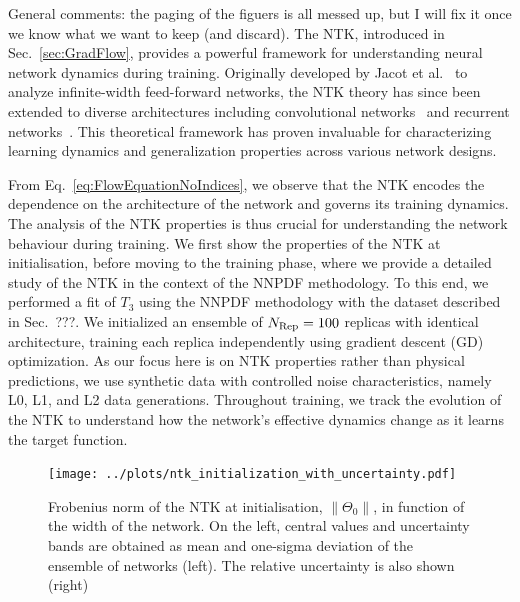\ac{General comments: the paging of the figuers is all messed up, but I will fix
it once we know what we want to keep (and discard).} The NTK, introduced in
Sec.~\ref{sec:GradFlow}, provides a powerful framework for understanding neural
network dynamics during training. Originally developed by Jacot et
al.~\cite{jacot2018neural} to analyze infinite-width feed-forward networks, the
NTK theory has since been extended to diverse architectures including
convolutional networks~\cite{arora2019exact} and recurrent
networks~\cite{alemohammad2021recurrent}. This theoretical framework has proven
invaluable for characterizing learning dynamics and generalization properties
across various network designs.

From Eq.~\eqref{eq:FlowEquationNoIndices}, we observe that the NTK encodes the
dependence on the architecture of the network and governs its training dynamics.
The analysis of the NTK properties is thus crucial for understanding the network
behaviour during training. We first show the properties of the NTK at
initialisation, before moving to the training phase, where we provide a detailed
study of the NTK in the context of the NNPDF methodology. To this end, we
performed a fit of $T_3$ using the NNPDF methodology with the dataset described
in Sec.~???. We initialized an ensemble of $N_{\rm Rep} = 100$ replicas with
identical architecture, training each replica independently using gradient
descent (GD) optimization. As our focus here is on NTK properties rather than
physical predictions, we use synthetic data with controlled noise
characteristics, namely L0, L1, and L2 data generations. Throughout training, we
track the evolution of the NTK to understand how the network's effective
dynamics change as it learns the target function.

\begin{figure}[h!]
  \centering
  \texttt{[image: ../plots/ntk\_initialization\_with\_uncertainty.pdf]}
  \caption{Frobenius norm of the NTK at initialisation, $\lVert \Theta_0
  \rVert$, in function of the width of the network. On the left, central values
  and uncertainty bands are obtained as mean and one-sigma deviation of the
  ensemble of networks (left). The relative uncertainty is also shown (right)}
  \label{fig:NTKInit}
\end{figure}

